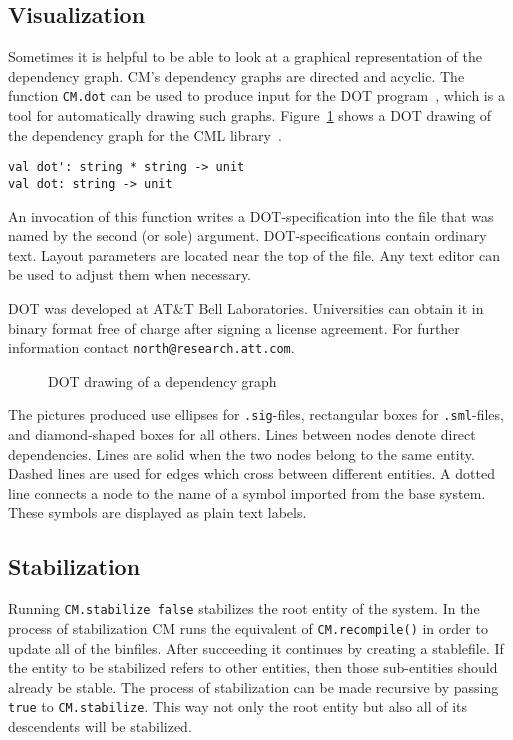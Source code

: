 \documentclass{article}
\begin{document}
\subsection{Visualization}

Sometimes it is helpful to be able to look at a graphical
representation of the dependency graph.  CM's dependency graphs are
directed and acyclic.  The function {\tt CM.dot} can be used to
produce input for the DOT program~\cite{north93:dot}, which is a tool for
automatically drawing such graphs.  Figure~\ref{fig:dotsample} shows a
DOT drawing of the dependency graph for the CML
library~\cite{reppy91:cml}.
\begin{verbatim}
val dot': string * string -> unit
val dot: string -> unit
\end{verbatim}
An invocation of this function writes a DOT-specification into the
file that was named by the second (or sole) argument.
DOT-specifications contain ordinary text.  Layout parameters are
located near the top of the file.  Any text editor can be used to
adjust them when necessary.

DOT was developed at AT\&T Bell Laboratories.  Universities can obtain
it in binary format free of charge after signing a license agreement.
For further information contact {\tt north@research.att.com}.

\begin{figure}
\centerline{}
\caption{DOT drawing of a dependency graph}
\label{fig:dotsample}
\end{figure}

The pictures produced use ellipses for {\tt .sig}-files, rectangular
boxes for {\tt .sml}-files, and diamond-shaped boxes for all others.
Lines between nodes denote direct dependencies.  Lines are solid when
the two nodes belong to the same entity. Dashed lines are used for edges
which cross between different entities.  A dotted line connects a node to
the name of a symbol imported from the base system.  These symbols are
displayed as plain text labels.

\subsection{Stabilization}

Running {\tt CM.stabilize false} stabilizes the root entity of the
system.  In the process of stabilization CM runs the equivalent of
{\tt CM.recompile()} in order to update all of the binfiles.  After
succeeding it continues by creating a stablefile.  If the entity to be
stabilized refers to other entities, then those sub-entities should
already be stable.  The process of stabilization can be made recursive
by passing {\tt true} to {\tt CM.stabilize}.  This way not only the
root entity but also all of its descendents will be stabilized.
\end{document}
